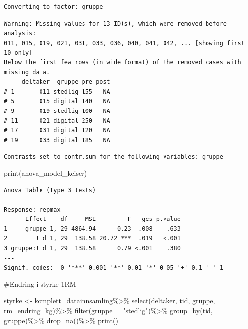 \documentclass[
  letterpaper,
  DIV=11,
  numbers=noendperiod]{scrreprt}
\newenvironment{Shaded}{\begin{snugshade}}{\end{snugshade}}
\newcommand{\FunctionTok}[1]{\textcolor[rgb]{0.28,0.35,0.67}{#1}}
\newcommand{\NormalTok}[1]{\textcolor[rgb]{0.00,0.23,0.31}{#1}}
\newcommand{\OtherTok}[1]{\textcolor[rgb]{0.00,0.23,0.31}{#1}}
\newcommand{\SpecialCharTok}[1]{\textcolor[rgb]{0.37,0.37,0.37}{#1}}
\newcommand{\StringTok}[1]{\textcolor[rgb]{0.13,0.47,0.30}{#1}}
\begin{document}
\begin{verbatim}
Converting to factor: gruppe
\end{verbatim}

\begin{verbatim}
Warning: Missing values for 13 ID(s), which were removed before analysis:
011, 015, 019, 021, 031, 033, 036, 040, 041, 042, ... [showing first 10 only]
Below the first few rows (in wide format) of the removed cases with missing data.
     deltaker  gruppe pre post
# 1       011 stedlig 155   NA
# 5       015 digital 140   NA
# 9       019 stedlig 100   NA
# 11      021 digital 250   NA
# 17      031 digital 120   NA
# 19      033 digital 185   NA
\end{verbatim}

\begin{verbatim}
Contrasts set to contr.sum for the following variables: gruppe
\end{verbatim}

\begin{Shaded}
\begin{Highlighting}[]
\FunctionTok{print}\NormalTok{(anova\_model\_keiser)}
\end{Highlighting}
\end{Shaded}

\begin{verbatim}
Anova Table (Type 3 tests)

Response: repmax
      Effect    df     MSE         F   ges p.value
1     gruppe 1, 29 4864.94      0.23  .008    .633
2        tid 1, 29  138.58 20.72 ***  .019   <.001
3 gruppe:tid 1, 29  138.58      0.79 <.001    .380
---
Signif. codes:  0 '***' 0.001 '**' 0.01 '*' 0.05 '+' 0.1 ' ' 1
\end{verbatim}

\#Endring i styrke 1RM

\begin{Shaded}
\begin{Highlighting}[]
\NormalTok{styrke }\OtherTok{\textless{}{-}}\NormalTok{ komplett\_datainnsamling}\SpecialCharTok{\%\textgreater{}\%}
  \FunctionTok{select}\NormalTok{(deltaker, tid, gruppe, rm\_endring\_kg)}\SpecialCharTok{\%\textgreater{}\%}
  \FunctionTok{filter}\NormalTok{(gruppe}\SpecialCharTok{==}\StringTok{"stedlig"}\NormalTok{)}\SpecialCharTok{\%\textgreater{}\%}
   \FunctionTok{group\_by}\NormalTok{(tid, gruppe)}\SpecialCharTok{\%\textgreater{}\%}
  \FunctionTok{drop\_na}\NormalTok{()}\SpecialCharTok{\%\textgreater{}\%}
  \FunctionTok{print}\NormalTok{()}
\end{Highlighting}
\end{Shaded}
\end{document}
